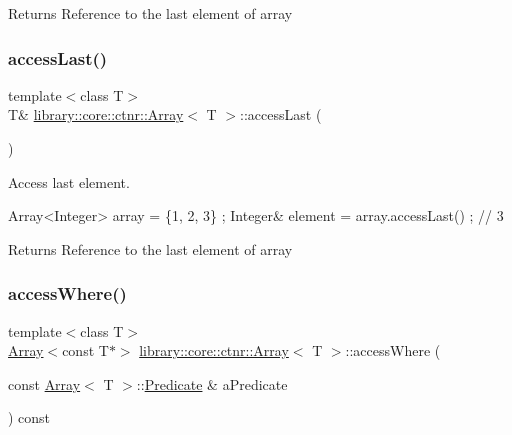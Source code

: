 \begin{DoxyReturn}{Returns}
Reference to the last element of array 
\end{DoxyReturn}
\mbox{\label{classlibrary_1_1core_1_1ctnr_1_1Array_ad6ea47ab09dfeebd6de0878d3ad2de25}} 
\subsubsection{\texorpdfstring{access\+Last()}{accessLast()}\hspace{0.1cm}{\footnotesize\ttfamily [2/2]}}
{\footnotesize\ttfamily template$<$class T$>$ \\
T\& \hyperlink{classlibrary_1_1core_1_1ctnr_1_1Array}{library\+::core\+::ctnr\+::\+Array}$<$ T $>$\+::access\+Last (\begin{DoxyParamCaption}{ }\end{DoxyParamCaption})}



Access last element. 


\begin{DoxyCode}
Array<Integer> array = \{1, 2, 3\} ;
Integer& element = array.accessLast() ; \textcolor{comment}{// 3}
\end{DoxyCode}


\begin{DoxyReturn}{Returns}
Reference to the last element of array 
\end{DoxyReturn}
\mbox{\label{classlibrary_1_1core_1_1ctnr_1_1Array_a5359c59d344a6147c7c6ea1012411011}} 
\subsubsection{\texorpdfstring{access\+Where()}{accessWhere()}}
{\footnotesize\ttfamily template$<$class T$>$ \\
\hyperlink{classlibrary_1_1core_1_1ctnr_1_1Array}{Array}$<$const T$\ast$$>$ \hyperlink{classlibrary_1_1core_1_1ctnr_1_1Array}{library\+::core\+::ctnr\+::\+Array}$<$ T $>$\+::access\+Where (\begin{DoxyParamCaption}\item[{const \hyperlink{classlibrary_1_1core_1_1ctnr_1_1Array}{Array}$<$ T $>$\+::\hyperlink{classlibrary_1_1core_1_1ctnr_1_1Array_a74cd325a740870aea490b6b739aa06ae}{Predicate} \&}]{a\+Predicate }\end{DoxyParamCaption}) const}



